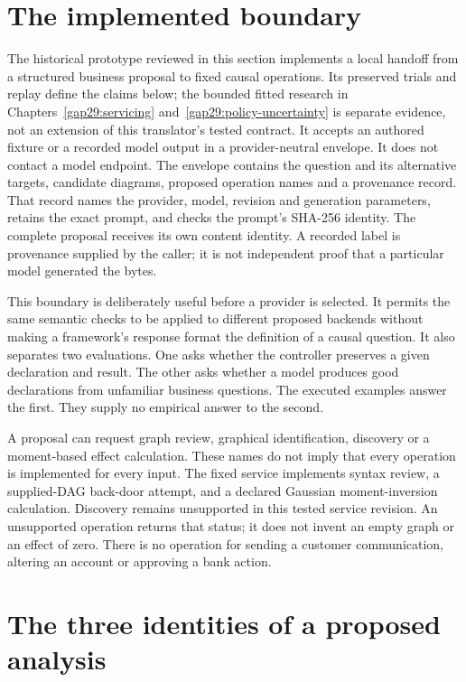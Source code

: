 \section{The implemented boundary}

The historical prototype reviewed in this section implements a local handoff
from a structured business proposal to fixed causal operations. Its preserved
trials and replay define the claims below; the bounded fitted research in
Chapters~\ref{gap29:servicing} and~\ref{gap29:policy-uncertainty} is separate
evidence, not an extension of this translator's tested contract. It accepts an authored fixture or a recorded model
output in a provider-neutral envelope. It does not contact a model endpoint.
The envelope contains the question and its alternative targets, candidate
diagrams, proposed operation names and a provenance record. That record names
the provider, model, revision and generation parameters, retains the exact
prompt, and checks the prompt's SHA-256 identity. The complete proposal receives
its own content identity. A recorded label is provenance supplied by the caller;
it is not independent proof that a particular model generated the bytes.

This boundary is deliberately useful before a provider is selected. It permits
the same semantic checks to be applied to different proposed backends without
making a framework's response format the definition of a causal question.
It also separates two evaluations. One asks whether the controller preserves a
given declaration and result. The other asks whether a model produces good
declarations from unfamiliar business questions. The executed examples answer
the first. They supply no empirical answer to the second.

A proposal can request graph review, graphical identification, discovery or a
moment-based effect calculation. These names do not imply that every operation
is implemented for every input. The fixed service implements syntax review,
a supplied-DAG back-door attempt, and a declared Gaussian moment-inversion
calculation. Discovery remains unsupported in this tested service revision. An unsupported
operation returns that status; it does not invent an empty graph or an effect
of zero. There is no operation for sending a customer communication, altering
an account or approving a bank action.

\section{The three identities of a proposed analysis}

